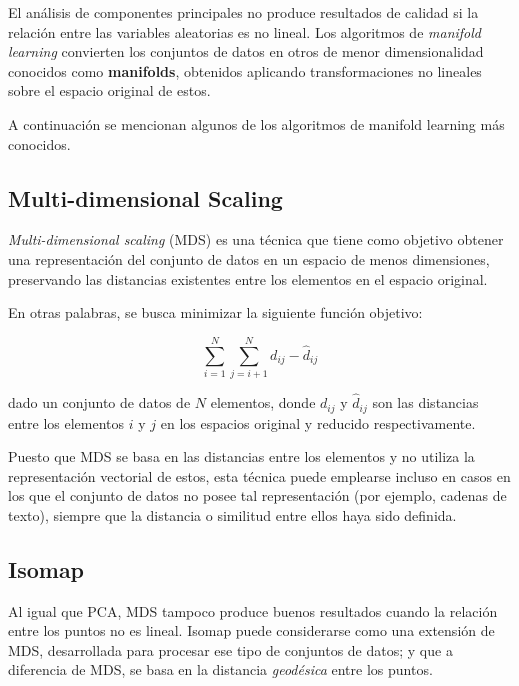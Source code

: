 El análisis de componentes principales no produce resultados de calidad si la relación entre las variables aleatorias es no lineal.
Los algoritmos de \textit{manifold learning} convierten los conjuntos de datos en otros de menor dimensionalidad conocidos como \textbf{manifolds}, obtenidos aplicando transformaciones no lineales sobre el espacio original de estos.

A continuación se mencionan algunos de los algoritmos de manifold learning más conocidos.

\subsection{Multi-dimensional Scaling}\label{subsec:MDS}

\textit{Multi-dimensional scaling} (MDS) es una técnica que tiene como objetivo obtener una representación del conjunto de datos en un espacio de menos dimensiones, preservando las distancias existentes entre los elementos en el espacio original.

En otras palabras, se busca minimizar la siguiente función objetivo:

\begin{equation}
    \label{eq:MDS}
    \sum_{i=1}^{N}\sum_{j=i+1}^{N}{d_{ij} - \hat{d}_{ij}}
\end{equation}

\noindent
dado un conjunto de datos de $N$ elementos, donde $d_{ij}$ y $\hat{d}_{ij}$ son las distancias entre los elementos $i$ y $j$ en los espacios original y reducido respectivamente.

Puesto que MDS se basa en las distancias entre los elementos y no utiliza la representación vectorial de estos, esta técnica puede emplearse incluso en casos en los que el conjunto de datos no posee tal representación (por ejemplo, cadenas de texto), siempre que la distancia o similitud entre ellos haya sido definida.

\subsection{Isomap}\label{subsec:isomap}

Al igual que PCA, MDS tampoco produce buenos resultados cuando la relación entre los puntos no es lineal.
Isomap puede considerarse como una extensión de MDS, desarrollada para procesar ese tipo de conjuntos de datos; y que a diferencia de MDS, se basa en la distancia \textit{geodésica} entre los puntos.

